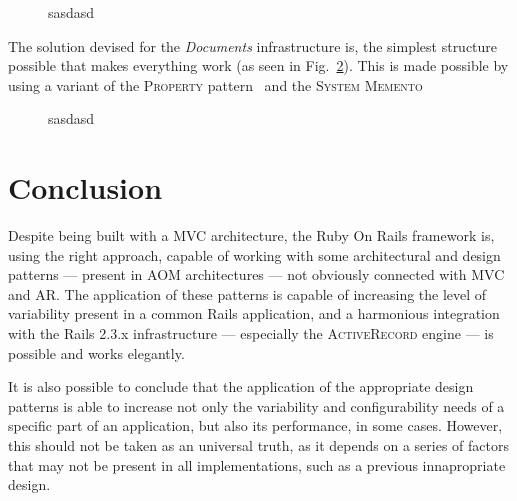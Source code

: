 \documentclass[9pt,a4paper]{extarticle}
\begin{document}
\begin{multicols}{2}
\begin{figure}[H]
  \caption{sasdasd}
  \label{fig:documents_current}
\end{figure}

The solution devised for the \emph{Documents} infrastructure is, the simplest structure possible that makes everything work (as seen in Fig.~\ref{fig:documents_conceptual}). This is made possible by using a variant of the \textsc{Property} pattern~\cite{metadata_and_active_object_models} and the \textsc{System Memento}~\cite{patterns_data_and_metadata_evolution_in_aoms}

\begin{figure}[H]
  \caption{sasdasd}
  \label{fig:documents_conceptual}
\end{figure}

\section{Conclusion}\label{sec:conclusion}

Despite being built with a MVC architecture, the Ruby On Rails framework is, using the right approach, capable of working with some architectural and design patterns --- present in AOM architectures --- not obviously connected with MVC and AR. The application of these patterns is capable of increasing the level of variability present in a common Rails application, and a harmonious integration with the Rails 2.3.x infrastructure --- especially the \textsc{ActiveRecord} engine --- is possible and works elegantly.

It is also possible to conclude that the application of the appropriate design patterns is able to increase not only the variability and configurability needs of a specific part of an application, but also its performance, in some cases. However, this should not be taken as an universal truth, as it depends on a series of factors that may not be present in all implementations, such as a previous innapropriate design.



\end{multicols}
\end{document}
